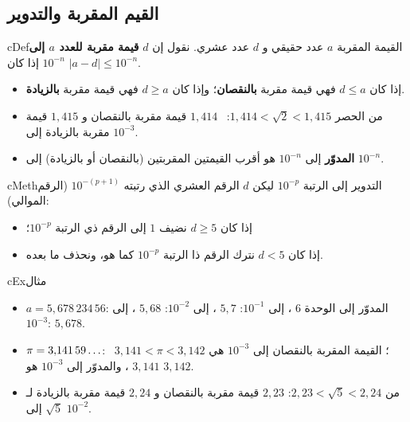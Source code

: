 \documentclass[12pt,a4paper]{article}
\newenvironment{BOX}[2]{\begin{otherlanguage}{english}\begin{arbox}{#1}{#2}}{\end{arbox}\end{otherlanguage}}
\newenvironment{tarif}[1][تعريف]{\begin{BOX}{cDef}{#1}}{\end{BOX}}
\newenvironment{mithal}[1][مثال]{\begin{BOX}{cEx}{#1}}{\end{BOX}}
\newenvironment{tariqa}[1][طريقة]{\begin{BOX}{cMeth}{#1}}{\end{BOX}}
\renewcommand{\ldots}{\mathinner{\ldotp\ldotp\ldotp}}
\let\origNeedspace\Needspace
\renewcommand{\Needspace}[1]{\origNeedspace{14\baselineskip}}
\begin{document}
\subsection{القيم المقربة والتدوير}
\begin{tarif}[القيمة المقربة]
$a$ عدد حقيقي و $d$ عدد عشري. نقول إن $d$ \textbf{قيمة مقربة للعدد $a$ إلى $10^{-n}$} إذا كان $|a-d|\leqslant10^{-n}$.
\begin{itemize}
\item إذا كان $d\leqslant a$ فهي قيمة مقربة \textbf{بالنقصان}؛ وإذا كان $d\geqslant a$ فهي قيمة مقربة \textbf{بالزيادة}.
\item من الحصر $1{,}414<\sqrt{2}<1{,}415$: \ $1{,}414$ قيمة مقربة بالنقصان و $1{,}415$ قيمة مقربة بالزيادة إلى $10^{-3}$.
\item \textbf{المدوّر} إلى $10^{-n}$ هو أقرب القيمتين المقربتين (بالنقصان أو بالزيادة) إلى $10^{-n}$.
\end{itemize}
\end{tarif}
\begin{tariqa}[التدوير إلى الرتبة $10^{-p}$]
ليكن $d$ الرقم العشري الذي رتبته $10^{-(p+1)}$ (الرقم الموالي):
\begin{itemize}
\item إذا كان $d\geqslant5$ نضيف $1$ إلى الرقم ذي الرتبة $10^{-p}$؛
\item إذا كان $d<5$ نترك الرقم ذا الرتبة $10^{-p}$ كما هو، ونحذف ما بعده.
\end{itemize}
\end{tariqa}
\begin{mithal}
\begin{itemize}
\item $a=5{,}678\,234\,56$: المدوّر إلى الوحدة $6$ ، إلى $10^{-1}$: $5{,}7$ ، إلى $10^{-2}$: $5{,}68$ ، إلى $10^{-3}$: $5{,}678$.
\item $\pi=3{,}141\,59\ldots$: \ $3{,}141<\pi<3{,}142$ ؛ القيمة المقربة بالنقصان إلى $10^{-3}$ هي $3{,}141$ ، والمدوّر إلى $10^{-3}$ هو $3{,}142$.
\item من $2{,}23<\sqrt{5}<2{,}24$: $2{,}23$ قيمة مقربة بالنقصان و $2{,}24$ قيمة مقربة بالزيادة لـ $\sqrt{5}$ إلى $10^{-2}$.
\end{itemize}
\end{mithal}

\origNeedspace{30\baselineskip}
\end{document}
